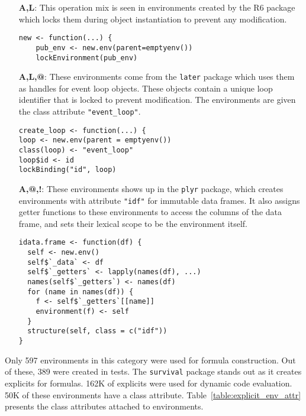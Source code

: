 \documentclass[sigplan,screen]{acmart}
\renewcommand{\c}[1]{\lstinline |#1|\xspace}
\begin{document}
\begin{itemize}
  \item[{\bf A,L}:] This operation mix is seen in environments created by the R6
    package which locks them during object instantiation to prevent any
    modification.

\begin{lstlisting}
new <- function(...) {
    pub_env <- new.env(parent=emptyenv())
    lockEnvironment(pub_env)
\end{lstlisting}\medskip

  \item[{\bf A,L,@}:] These environments come from the \c{later} package which
    uses them as handles for event loop objects. These objects contain a unique
    loop identifier that is locked to prevent modification. The environments
    are given the class attribute \c{"event_loop"}.

\begin{lstlisting}
create_loop <- function(...) {
loop <- new.env(parent = emptyenv())
class(loop) <- "event_loop"
loop$id <- id
lockBinding("id", loop)
\end{lstlisting}\medskip
  
  \item[{\bf A,@,!}:] These environments shows up in the \c{plyr} package, which
    creates environments with attribute \c{"idf"} for immutable data frames. It
    also assigns getter functions to these environments to access the columns of
    the data frame, and sets their lexical scope to be the environment itself.

\begin{lstlisting}
idata.frame <- function(df) {
  self <- new.env()
  self$`_data` <- df
  self$`_getters` <- lapply(names(df), ...)
  names(self$`_getters`) <- names(df)
  for (name in names(df)) {
    f <- self$`_getters`[[name]]
    environment(f) <- self
  }
  structure(self, class = c("idf"))
}
\end{lstlisting}\medskip
  
\end{itemize}

\noindent
Only 597 environments in this category were used for formula construction. Out
of these, 389 were created in tests. The \c{survival} package stands out as it
creates explicits for formulas. 162K of explicits were used for dynamic code
evaluation. 50K of these environments have a class attribute.
Table~\ref{table:explicit_env_attr} presents the class attributes attached to
environments.
\end{document}
